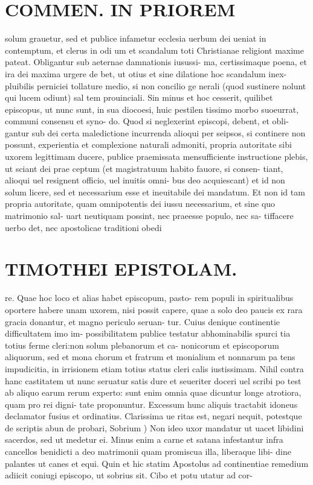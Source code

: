 \documentclass{article}
\begin{document}
\begin{pages}
\section*{COMMEN. IN PRIOREM }
\marginpar{[ p.72 ]}\pstart solum grauetur, sed et publice infametur ecclesia uerbum dei ueniat in contemptum, et clerus in odi um et scandalum toti Christianae religiont maxime pateat. Obligantur sub aeternae damnationis iusussi- ma, certissimaque poena, et ira dei maxima urgere de bet, ut otius et sine dilatione hoc scandalum inex- pluibilis perniciei tollature medio, si non concilio ge nerali (quod sustinere nolunt qui lucem odiunt) sal tem prouinciali. Sin minus et hoc cesserit, quilibet episcopus, ut nunc sunt, in sua diocoesi, huic pestilen tissimo morbo suoeurrat, communi consensu et syno- do. Quod si neglexerint episcopi, debent, et obli- gantur sub dei certa maledictione incurrenda alioqui per seipsos, si continere non possunt, experientia et complexione naturali admoniti, propria autoritate sibi uxorem legittimam ducere, publice praemissata mensufficiente instructione plebis, ut sciant dei prae ceptum (et magistratuum habito fauore, si consen- tiant, alioqui uel resignent officio, uel inuitis omni- bus deo acquiescant) et id non solum licere, sed et necessarium esse et ineuitabile dei mandatum. Et non id tam propria autoritate, quam omnipotentis dei iussu necessarium, et sine quo matrimonio sal- uart neutiquam possint, nec praeesse populo, nec sa- tiffacere uerbo det, nec apostolicae traditioni obedi  \pend
\section*{TIMOTHEI EPISTOLAM. }
\marginpar{[ p.73 ]}\pstart re. Quae hoc loco et alias habet episcopum, pasto- rem populi in spiritualibus oportere habere unam uxorem, nisi possit capere, quae a solo deo paucis ex rara gracia donantur, et magno periculo seruan- tur. Cuius denique continentie difficultatem imo im- possibilitatem publice testatur abhominabilis spurci tia totius ferme cleri:non solum plebanorum et ca- nonicorum et episcoporum aliquorum, sed et mona chorum et fratrum et monialium et nonnarum pa tens impudicitia, in irrisionem etiam totius status cleri calis iustissimam. Nihil contra hanc castitatem ut nunc seruatur satis dure et seueriter doceri uel scribi po test ab aliquo earum rerum experto: sunt enim omnia quae dicuntur longe atrotiora, quam pro rei digni- tate proponuntur. Excessum hunc aliquis tractabit idoneus declamator fusius et ordinatius. Clarissima ue ritas est, negari nequit, potestque de scriptis abun de probari,  \pend\pstart Sobrium ) Non ideo uxor mandatur ut uacet libidini sacerdos, sed ut medetur ei. Minus enim a carne et satana infestantur infra cancellos benidicti a deo matrimonii quam promiscua illa, liberaque libi- dine palantes ut canes et equi. Quin et hic statim Apostolus ad continentiae remedium adiicit coniugi episcopo, ut sobrius sit. Cibo et potu utatur ad cor-  \pend

\end{pages}
\end{document}
